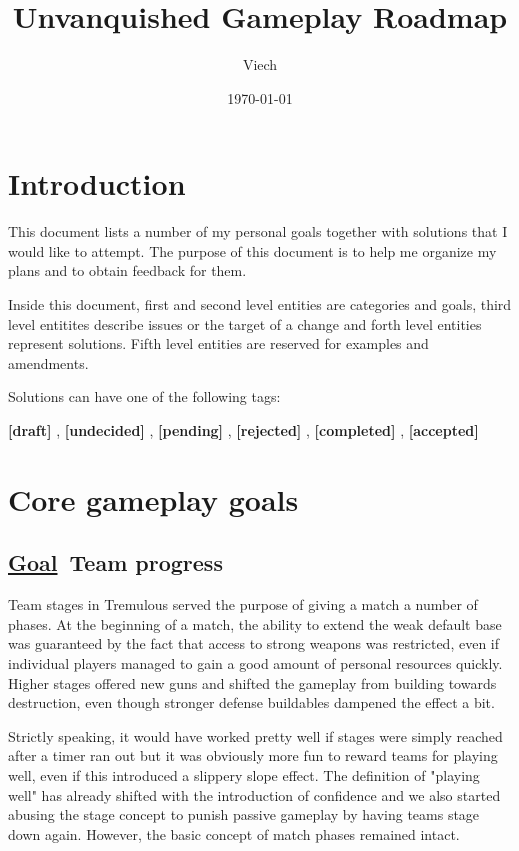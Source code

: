 \documentclass{scrartcl}
\title{Unvanquished Gameplay Roadmap}
\author{Viech}
\date{\today}
\newcommand{\goal}     [0]{\textbf{\underline{Goal}\ }}
\newcommand{\draft}    [0]{\textcolor{draft}    {\textbf{[draft] }}}
\newcommand{\undecided}[0]{\textcolor{undecided}{\textbf{[undecided] }}}
\newcommand{\pending}  [0]{\textcolor{pending}  {\textbf{[pending] }}}
\newcommand{\rejected} [0]{\textcolor{rejected} {\textbf{[rejected] }}}
\newcommand{\completed}[0]{\textcolor{completed}{\textbf{[completed] }}}
\newcommand{\accepted} [0]{\textcolor{completed}{\textbf{[accepted] }}}
\begin{document}
\maketitle
\tableofcontents

\section{Introduction}

This document lists a number of my personal goals together with solutions that I would like to attempt. The purpose of this document is to help me organize my plans and to obtain feedback for them.

Inside this document, first and second level entities are categories and goals, third level entitites describe issues or the target of a change and forth level entities represent solutions. Fifth level entities are reserved for examples and amendments.

Solutions can have one of the following tags:

\draft, \undecided, \pending, \rejected, \completed, \accepted

\section{Core gameplay goals}

\subsection{\goal Team progress}

Team stages in Tremulous served the purpose of giving a match a number of phases. At the beginning of a match, the ability to extend the weak default base was guaranteed by the fact that access to strong weapons was restricted, even if individual players managed to gain a good amount of personal resources quickly. Higher stages offered new guns and shifted the gameplay from building towards destruction, even though stronger defense buildables dampened the effect a bit.

Strictly speaking, it would have worked pretty well if stages were simply reached after a timer ran out but it was obviously more fun to reward teams for playing well, even if this introduced a slippery slope effect. The definition of "playing well" has already shifted with the introduction of confidence and we also started abusing the stage concept to punish passive gameplay by having teams stage down again. However, the basic concept of match phases remained intact.
\end{document}
